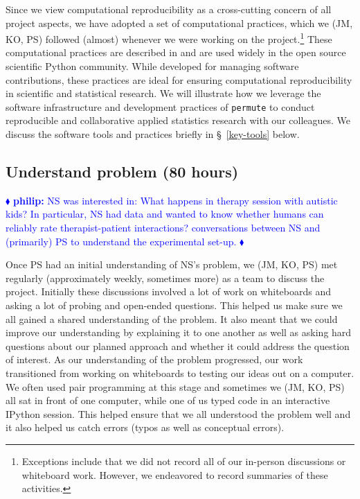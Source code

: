 \documentclass[]{article}
\newcommand{\philip}[1] { \textcolor{blue} {
\ensuremath{\blacklozenge} {\bf philip:}  {#1}
\ensuremath{\blacklozenge} } }
\begin{document}
Since we view computational reproducibility as a cross-cutting concern of all
project aspects, we have adopted a set of computational practices, which we
(JM, KO, PS) followed (almost) whenever we were working on the
project.\footnote{Exceptions include that we did not record all of our
in-person discussions or whiteboard work.  
However, we endeavored to
record summaries of these activities.}
These computational practices are described in \citet{millman2014developing}
and are used widely in the open source scientific Python community.
While developed for managing software contributions, these practices are ideal
for ensuring computational reproducibility in scientific and statistical
research.
We will illustrate how we leverage the software infrastructure and development
practices of \texttt{permute} to conduct reproducible and collaborative applied
statistics research with our colleagues.
We discuss the software tools and practices briefly in \S~\ref{key-tools} below.

\subsection{Understand problem (80 hours)}

\philip{
NS was interested in:  What happens in therapy session with autistic kids?
In particular, NS had data and wanted to know whether humans can reliably rate
therapist-patient interactions?
conversations between NS and (primarily) PS to understand the experimental
set-up.
}

Once PS had an initial understanding of NS's problem, we (JM, KO, PS) met
regularly (approximately weekly, sometimes more) as a team to discuss the
project.
Initially these discussions involved a lot of work on whiteboards and asking a
lot of probing and open-ended questions.
This helped us make sure we all gained a shared understanding of the problem.
It also meant that we could improve our understanding by explaining it to one
another as well as asking hard questions about our planned approach and whether
it could address the question of interest.
As our understanding of the problem progressed, our work transitioned from
working on whiteboards to testing our ideas out on a computer.
We often used pair programming at this stage and sometimes we (JM, KO, PS)
all sat in front of one computer, while one of us typed code in an interactive
IPython session.
This helped ensure that we all understood the problem well and it also helped
us catch errors (typos as well as conceptual errors).
\end{document}
